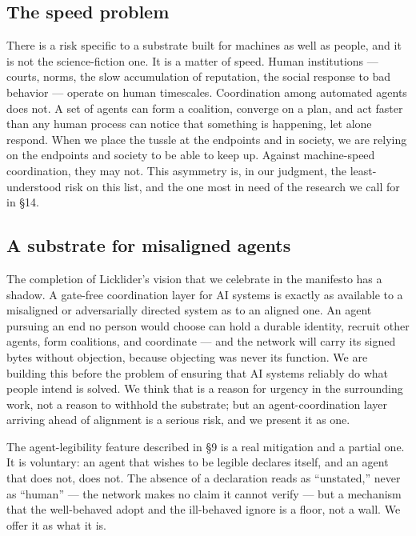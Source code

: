 \documentclass[nobib,justified]{tufte-handout}
\begin{document}
\subsection{The speed problem}

There is a risk specific to a substrate built for machines as well as people, and
it is not the science-fiction one. It is a matter of speed. Human institutions
--- courts, norms, the slow accumulation of reputation, the social response to
bad behavior --- operate on human timescales. Coordination among automated agents
does not. A set of agents can form a coalition, converge on a plan, and act
faster than any human process can notice that something is happening, let alone
respond. When we place the tussle at the endpoints and in society, we are relying
on the endpoints and society to be able to keep up. Against machine-speed
coordination, they may not. This asymmetry is, in our judgment, the
least-understood risk on this list, and the one most in need of the research we
call for in \S14.

\subsection{A substrate for misaligned agents}

The completion of Licklider's vision that we celebrate in the manifesto has a
shadow. A gate-free coordination layer for AI systems is exactly as available to
a misaligned or adversarially directed system as to an aligned one. An agent
pursuing an end no person would choose can hold a durable identity, recruit other
agents, form coalitions, and coordinate --- and the network will carry its signed
bytes without objection, because objecting was never its function. We are building
this before the problem of ensuring that AI systems reliably do what people intend
is solved. We think that is a reason for urgency in the surrounding work, not a
reason to withhold the substrate; but an agent-coordination layer arriving ahead of alignment is a serious risk, and we present it as one.

The agent-legibility feature described in \S9 is a real mitigation and a
partial one. It is voluntary: an agent that wishes to be legible declares itself,
and an agent that does not, does not. The absence of a declaration reads as
``unstated,'' never as ``human'' --- the network makes no claim it cannot verify
--- but a mechanism that the well-behaved adopt and the ill-behaved ignore is a
floor, not a wall. We offer it as what it is.
\end{document}
